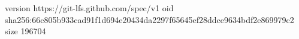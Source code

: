 version https://git-lfs.github.com/spec/v1
oid sha256:66c805b933cad91f1d694e20434da2297f65645ef28ddce9634bdf2e869979c2
size 196704
